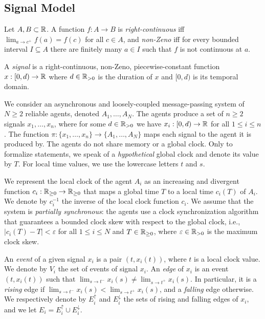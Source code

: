\subsection{Signal Model}

Let $A,B \subset \mathbb{R}$.
%
A function $f : A \to B$ is
\emph{right-continuous} iff $\lim_{a \to c^+} f(a) = f(c)$ for all $c \in A$, and
\emph{non-Zeno} iff for every bounded interval $I \subseteq A$ there are finitely many $a \in I$ such that $f$ is not continuous at $a$.


\begin{definition}
	A \emph{signal} is a right-continuous, non-Zeno, piecewise-constant function $x : [0,d) \to \mathbb{R}$ where $d \in \mathbb{R}_{> 0}$ is the duration of $x$ and $[0,d)$ is its temporal domain.
\end{definition}

We consider an asynchronous and loosely-coupled message-passing system of $N \geq 2$ reliable 
agents, denoted $A_1, \ldots, A_N$.
%
The agents produce a set of $n \geq 2$ signals $x_1, \ldots, x_n$, where for some $d \in \mathbb{R}_{> 0}$ 
we have $x_i : [0,d) \to \mathbb{R}$ for all $1 \leq i \leq n$.
%
The function $\pi : \{x_1, \ldots, x_n\} \to \{A_1, \ldots, A_N\}$ maps each signal to the agent it is 
produced by. 
%
The agents do not share memory or a global clock.
%
Only to formalize statements, we speak of a {\em hypothetical} global clock and denote its value by 
$T$.
%
For local time values, we use the lowercase letters $t$ and $s$.

We represent the local clock of the agent $A_i$ as an increasing and divergent function $c_i : 
\mathbb{R}_{\geq 0} \to \mathbb{R}_{\geq 0}$ that maps a global time $T$ to a local time $c_i(T)$ of $A_i$.
%
We denote by $c_i^{-1}$ the inverse of the local clock function $c_i$.
%
We assume that the system is \emph{partially synchronous}: the agents use a clock synchronization algorithm that guarantees a bounded clock skew with respect to the global clock, i.e., $|c_i(T) - T| < \varepsilon$ for all $1 \leq i \leq N$ and $T \in \mathbb{R}_{\geq 0}$, where $\varepsilon \in \mathbb{R}_{> 0}$ is the maximum clock skew.



An \emph{event} of a given signal $x_i$ is a pair $(t, x_i(t))$, where $t$ is a local clock value.
We denote by $V_i$ the set of events of signal $x_i$.
%
An \emph{edge} of $x_i$ is an event $(t, x_i(t))$ such that $\lim_{s \to t^-} x_i(s) \neq \lim_{s \to t^+} x_i(s)$.
In particular, it is a \emph{rising} edge if $\lim_{s \to t^-} x_i(s) < \lim_{s \to t^+} x_i(s)$, and a \emph{falling} edge otherwise.
We respectively denote by $E_i^\uparrow$ and $E_i^\downarrow$ the sets of rising and falling edges of $x_i$, and we let $E_i = E_i^\uparrow \cup E_i^\downarrow$.

